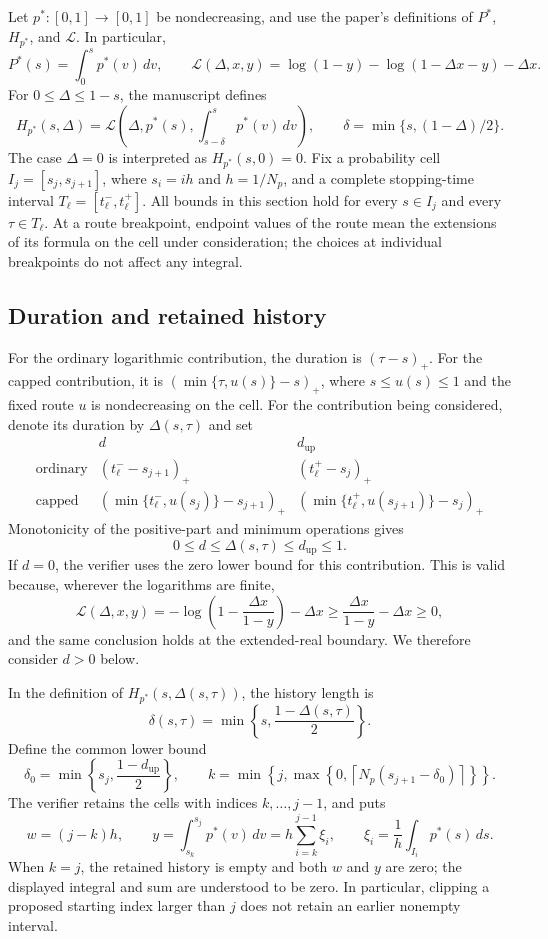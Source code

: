 \documentclass[11pt,a4paper]{article}
\begin{document}
Let $p^*:[0,1]\to[0,1]$ be nondecreasing, and use the paper's
definitions of $P^*$, $H_{p^*}$, and $\mathcal L$.  In particular,
\[
 P^*(s)=\int_0^s p^*(v)\,dv,
 \qquad
 \mathcal L(\Delta,x,y)=\log(1-y)-\log(1-\Delta x-y)-\Delta x.
\]
For $0\le\Delta\le1-s$, the manuscript defines
\[
 H_{p^*}(s,\Delta)
 =\mathcal L\!\left(\Delta,p^*(s),
        \int_{s-\delta}^{s}p^*(v)\,dv\right),
 \qquad \delta=\min\{s,(1-\Delta)/2\}.
\]
The case $\Delta=0$ is interpreted as $H_{p^*}(s,0)=0$.
Fix a probability cell $I_j=[s_j,s_{j+1}]$, where
$s_i=ih$ and $h=1/N_p$, and a complete stopping-time interval
$T_\ell=[t_\ell^-,t_\ell^+]$.  All bounds in this section hold for
every $s\in I_j$ and every $\tau\in T_\ell$.  At a route breakpoint,
endpoint values of the route mean the extensions of its formula on
the cell under consideration; the choices at individual breakpoints
do not affect any integral.

\subsection{Duration and retained history}

For the ordinary logarithmic contribution, the duration is
$(\tau-s)_+$.  For the capped contribution, it is
$(\min\{\tau,u(s)\}-s)_+$, where $s\le u(s)\le1$ and the fixed
route $u$ is nondecreasing on the cell.  For the contribution being
considered, denote its duration by $\Delta(s,\tau)$ and set
\[
\begin{array}{c|c|c}
 & d & d_{\mathrm{up}}\\ \hline
\text{ordinary}
 &(t_\ell^- -s_{j+1})_+
 &(t_\ell^+ -s_j)_+\\[2pt]
\text{capped}
 &(\min\{t_\ell^-,u(s_j)\}-s_{j+1})_+
 &(\min\{t_\ell^+,u(s_{j+1})\}-s_j)_+
\end{array}
\]
Monotonicity of the positive-part and minimum operations gives
\[
 0\le d\le\Delta(s,\tau)\le d_{\mathrm{up}}\le1.
\]
If $d=0$, the verifier uses the zero lower bound for this
contribution.  This is valid because, wherever the logarithms are
finite,
\[
 \mathcal L(\Delta,x,y)
 =-\log\left(1-\frac{\Delta x}{1-y}\right)-\Delta x
 \ge \frac{\Delta x}{1-y}-\Delta x\ge0,
\]
and the same conclusion holds at the extended-real boundary.
We therefore consider $d>0$ below.

In the definition of $H_{p^*}(s,\Delta(s,\tau))$, the history length is
\[
 \delta(s,\tau)=
 \min\left\{s,\frac{1-\Delta(s,\tau)}2\right\}.
\]
Define the common lower bound
\[
 \delta_0=\min\left\{s_j,\frac{1-d_{\mathrm{up}}}2\right\},
 \qquad
 k=\min\left\{j,\max\left\{0,
   \left\lceil N_p(s_{j+1}-\delta_0)\right\rceil
 \right\}\right\}.
\]
The verifier retains the cells with indices $k,\ldots,j-1$, and puts
\[
 w=(j-k)h,
 \qquad
 y=\int_{s_k}^{s_j}p^*(v)\,dv
   =h\sum_{i=k}^{j-1}\xi_i,
 \qquad
 \xi_i=\frac1h\int_{I_i}p^*(s)\,ds.
\]
When $k=j$, the retained history is empty and both $w$ and $y$ are
zero; the displayed integral and sum are understood to be zero.
In particular, clipping a proposed starting index larger than $j$
does not retain an earlier nonempty interval.
\end{document}
